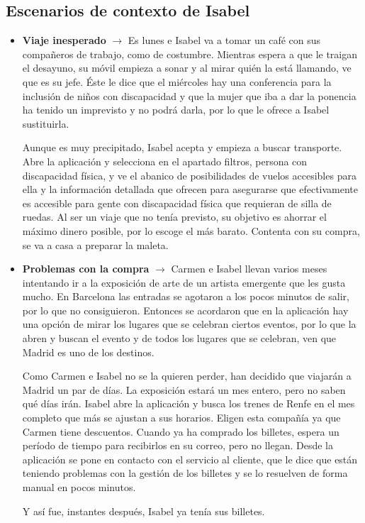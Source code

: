 \subsection{Escenarios de contexto de Isabel}
\begin{itemize}
      \item \textbf{Viaje inesperado} $\rightarrow$ Es lunes e Isabel va a tomar un café con sus compañeros de trabajo, como de costumbre. Mientras espera a que le traigan el desayuno, su móvil empieza a sonar y al mirar quién la está llamando, ve que es su jefe. Éste le dice que el miércoles hay una conferencia para la inclusión de niños con discapacidad y que la mujer que iba a dar la ponencia ha tenido un imprevisto y no podrá darla, por lo que le ofrece a Isabel sustituirla.

            Aunque es muy precipitado, Isabel acepta y empieza a buscar transporte. Abre la
            aplicación y selecciona en el apartado filtros, persona con discapacidad
            física, y ve el abanico de posibilidades de vuelos accesibles para ella y la
            información detallada que ofrecen para asegurarse que efectivamente es
            accesible para gente con discapacidad física que requieran de silla de ruedas.
            Al ser un viaje que no tenía previsto, su objetivo es ahorrar el máximo dinero
            posible, por lo escoge el más barato. Contenta con su compra, se va a casa a
            preparar la maleta.

      \item \textbf{Problemas con la compra} $\rightarrow$ Carmen e Isabel llevan varios meses intentando ir a la exposición de arte de un artista emergente que les gusta mucho. En Barcelona las entradas se agotaron a los pocos minutos de salir, por lo que no consiguieron. Entonces se acordaron que en la aplicación hay una opción de mirar los lugares que se celebran ciertos eventos, por lo que la abren y buscan el evento y de todos los lugares que se celebran, ven que Madrid es uno de los destinos.

            Como Carmen e Isabel no se la quieren perder, han decidido que viajarán a
            Madrid un par de días. La exposición estará un mes entero, pero no saben qué
            días irán. Isabel abre la aplicación y busca los trenes de Renfe en el mes
            completo que más se ajustan a sus horarios. Eligen esta compañía ya que Carmen
            tiene descuentos. Cuando ya ha comprado los billetes, espera un período de
            tiempo para recibirlos en su correo, pero no llegan. Desde la aplicación se
            pone en contacto con el servicio al cliente, que le dice que están teniendo
            problemas con la gestión de los billetes y se lo resuelven de forma manual en
            pocos minutos.

            Y así fue, instantes después, Isabel ya tenía sus billetes.

\end{itemize}

